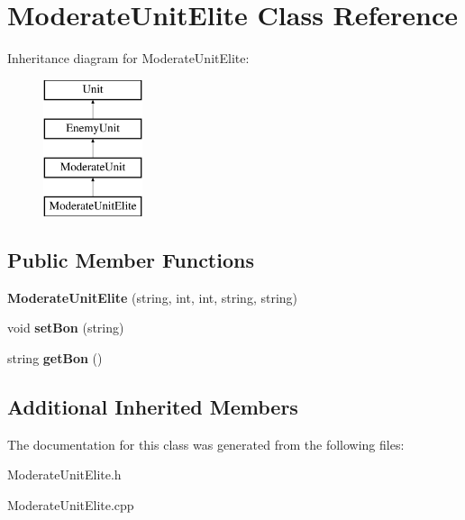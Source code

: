 \hypertarget{class_moderate_unit_elite}{}\section{Moderate\+Unit\+Elite Class Reference}
\label{class_moderate_unit_elite}
Inheritance diagram for Moderate\+Unit\+Elite\+:\begin{figure}[H]
\begin{center}
\leavevmode
\includegraphics[height=4.000000cm]{class_moderate_unit_elite}
\end{center}
\end{figure}
\subsection*{Public Member Functions}
\begin{DoxyCompactItemize}
\item 
\hypertarget{class_moderate_unit_elite_a03d56dacbd2de505bd599b4dac1c5bcb}{}{\bfseries Moderate\+Unit\+Elite} (string, int, int, string, string)\label{class_moderate_unit_elite_a03d56dacbd2de505bd599b4dac1c5bcb}

\item 
\hypertarget{class_moderate_unit_elite_a1e9c5f1e34b5f1da8eb405c091a35188}{}void {\bfseries set\+Bon} (string)\label{class_moderate_unit_elite_a1e9c5f1e34b5f1da8eb405c091a35188}

\item 
\hypertarget{class_moderate_unit_elite_ac07b4185480f96ef5cf5f47f1eba35ce}{}string {\bfseries get\+Bon} ()\label{class_moderate_unit_elite_ac07b4185480f96ef5cf5f47f1eba35ce}

\end{DoxyCompactItemize}
\subsection*{Additional Inherited Members}


The documentation for this class was generated from the following files\+:\begin{DoxyCompactItemize}
\item 
Moderate\+Unit\+Elite.\+h\item 
Moderate\+Unit\+Elite.\+cpp\end{DoxyCompactItemize}
